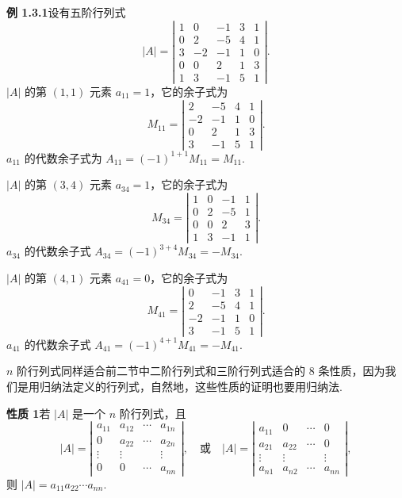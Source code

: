 \documentclass[UTF8, 12pt, fontset=fandol, oneside]{ctexart}
\begin{document}
\noindent\textbf{例 1.3.1}\quad 设有五阶行列式
\[
|A|=
\left|\begin{array}{ccccc}
1 & 0 & -1 & 3 & 1\\
0 & 2 & -5 & 4 & 1\\
3 & -2 & -1 & 1 & 0\\
0 & 0 & 2 & 1 & 3\\
1 & 3 & -1 & 5 & 1
\end{array}\right|.
\]
$|A|$ 的第 $(1,1)$ 元素 $a_{11}=1$，它的余子式为
\[
M_{11}=
\left|\begin{array}{cccc}
2 & -5 & 4 & 1\\
-2 & -1 & 1 & 0\\
0 & 2 & 1 & 3\\
3 & -1 & 5 & 1
\end{array}\right|.
\]
$a_{11}$ 的代数余子式为 $A_{11}=(-1)^{1+1}M_{11}=M_{11}$.

$|A|$ 的第 $(3,4)$ 元素 $a_{34}=1$，它的余子式为
\[
M_{34}=
\left|\begin{array}{cccc}
1 & 0 & -1 & 1\\
0 & 2 & -5 & 1\\
0 & 0 & 2 & 3\\
1 & 3 & -1 & 1
\end{array}\right|.
\]
$a_{34}$ 的代数余子式 $A_{34}=(-1)^{3+4}M_{34}=-M_{34}$.

$|A|$ 的第 $(4,1)$ 元素 $a_{41}=0$，它的余子式为
\[
M_{41}=
\left|\begin{array}{cccc}
0 & -1 & 3 & 1\\
2 & -5 & 4 & 1\\
-2 & -1 & 1 & 0\\
3 & -1 & 5 & 1
\end{array}\right|.
\]
$a_{41}$ 的代数余子式 $A_{41}=(-1)^{4+1}M_{41}=-M_{41}$.

$n$ 阶行列式同样适合前二节中二阶行列式和三阶行列式适合的 8 条性质，因为我们是用归纳法定义的行列式，自然地，这些性质的证明也要用归纳法.

\noindent\textbf{性质 1}\quad 若 $|A|$ 是一个 $n$ 阶行列式，且
\[
|A|=
\left|\begin{array}{cccc}
a_{11} & a_{12} & \cdots & a_{1n}\\
0 & a_{22} & \cdots & a_{2n}\\
\vdots & \vdots & & \vdots\\
0 & 0 & \cdots & a_{nn}
\end{array}\right|,
\quad\text{或}\quad
|A|=
\left|\begin{array}{cccc}
a_{11} & 0 & \cdots & 0\\
a_{21} & a_{22} & \cdots & 0\\
\vdots & \vdots & & \vdots\\
a_{n1} & a_{n2} & \cdots & a_{nn}
\end{array}\right|,
\]
则 $|A|=a_{11}a_{22}\cdots a_{nn}$.
\end{document}
